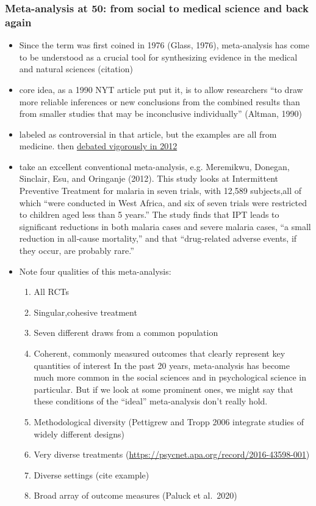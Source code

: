 \documentclass[
  man]{apa6}
\providecommand{\tightlist}{%
  \setlength{\itemsep}{0pt}\setlength{\parskip}{0pt}}
\begin{document}
\subsubsection{Meta-analysis at 50: from social to medical science and back again}\label{meta-analysis-at-50-from-social-to-medical-science-and-back-again}

\begin{itemize}
\item
  Since the term was first coined in 1976 (Glass, 1976), meta-analysis has come to be understood as a crucial tool for synthesizing evidence in the medical and natural sciences (citation)
\item
  core idea, as a 1990 NYT article put put it, is to allow researchers ``to draw more reliable inferences or new conclusions from the combined results than from smaller studies that may be inconclusive individually'' (Altman, 1990)
\item
  labeled as controversial in that article, but the examples are all from medicine. then \href{https://www.nytimes.com/2012/10/16/science/stanford-organic-food-study-and-vagaries-of-meta-analyses.html}{debated vigorously in 2012}
\item
  take an excellent conventional meta-analysis, e.g. Meremikwu, Donegan, Sinclair, Esu, and Oringanje (2012). This study looks at Intermittent Preventive Treatment for malaria in seven trials, with 12,589 subjects,all of which ``were conducted in West Africa, and six of seven trials were restricted to children aged less than 5 years.'' The study finds that IPT leads to significant reductions in both malaria cases and severe malaria cases, ``a small reduction in all‐cause mortality,'' and that ``drug‐related adverse events, if they occur, are probably rare.''
\item
  Note four qualities of this meta-analysis:

  \begin{enumerate}
  \def\labelenumi{\arabic{enumi}.}
  \tightlist
  \item
    All RCTs
  \item
    Singular,cohesive treatment
  \item
    Seven different draws from a common population
  \item
    Coherent, commonly measured outcomes that clearly represent key quantities of interest
    In the past 20 years, meta-analysis has become much more common in the social sciences and in psychological science in particular. But if we look at some prominent ones, we might say that these conditions of the ``ideal'' meta-analysis don't really hold.
  \item
    Methodological diversity (Pettigrew and Tropp 2006 integrate studies of widely different designs)
  \item
    Very diverse treatments (\url{https://psycnet.apa.org/record/2016-43598-001})
  \item
    Diverse settings (cite example)
  \item
    Broad array of outcome measures (Paluck et al.~2020)
  \end{enumerate}
\end{itemize}
\end{document}
